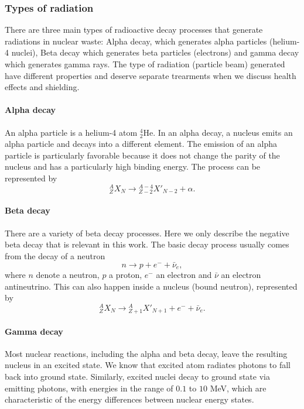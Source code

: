 \documentclass[nofootinbib,preprint,aps]{revtex4-1}
\begin{document}
        \subsubsection{Types of radiation}
        There are three main types of radioactive decay processes that generate radiations in nuclear waste: 
        Alpha decay, which generates alpha particles (helium-4 nuclei), Beta decay which generates beta
        particles (electrons) and gamma decay which generates gamma rays.
        The type of radiation (particle beam) generated
        have different properties and deserve separate trearments when we discuss health effects and shielding.
        \paragraph{Alpha decay}
        An alpha particle is a helium-4 atom ${}^4_2$He. In an alpha decay, a nucleus emits an alpha
        particle and decays into a different element. The emission of an alpha particle is
        particularly favorable because it does not change the parity of the nucleus and has a particularly
        high binding energy. The process can be represented by
        \begin{equation}
            {}^A_Z X_N \rightarrow {}^{A-4}_{Z-2}X'_{N-2} + \alpha.
        \end{equation}

        \paragraph{Beta decay}
        There are a variety of beta decay processes. Here we only describe the negative beta decay that is
        relevant in this work. The basic decay process usually comes from the decay of a neutron
        \begin{equation}
            n \rightarrow p + e^- + \bar{\nu}_e,
        \end{equation}
        where $n$ denote  a neutron, $p$ a proton, $e^-$ an electron and $\bar{\nu}$ an electron antineutrino.
        This can also happen inside a nucleus (bound neutron), represented by
        \begin{equation}
            {}^A_Z X_N \rightarrow {}^A_{Z+1} X'_{N+1} + e^- + \bar{\nu}_e.
        \end{equation}

        \paragraph{Gamma decay}
        Most nuclear reactions, including the alpha and beta decay, leave the resulting nucleus in
        an excited state.
        We know that excited atom radiates photons to fall back into ground state. Similarly, excited nuclei
        decay to ground state via emitting photons, with energies in the range
        of $0.1$ to $10$ MeV, which are characteristic of the energy differences between nuclear energy states.
    
\end{document}
